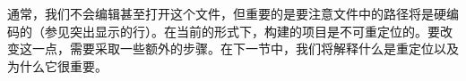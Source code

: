通常，我们不会编辑甚至打开这个文件，但重要的是要注意文件中的路径将是硬编码的（参见突出显示的行）。在当前的形式下，构建的项目是不可重定位的。要改变这一点，需要采取一些额外的步骤。在下一节中，我们将解释什么是重定位以及为什么它很重要。












































































